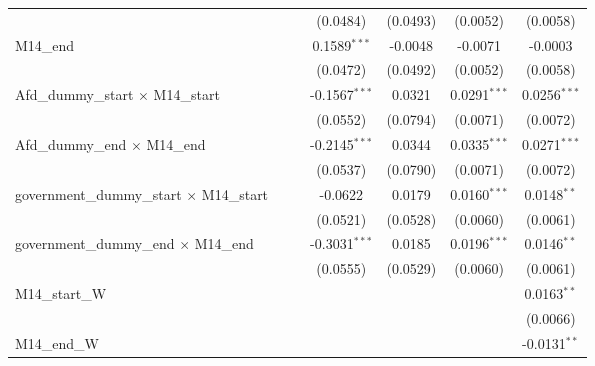 \documentclass[10pt,a4paper]{article}
\begin{document}
\begin{tabular}{lcccccc}
                                                    &                &                & (0.0484)        & (0.0493)       & (0.0052)        & (0.0058)\\    
   M14\_end                                         &                &                & 0.1589$^{***}$  & -0.0048        & -0.0071         & -0.0003\\   
                                                    &                &                & (0.0472)        & (0.0492)       & (0.0052)        & (0.0058)\\   
   Afd\_dummy\_start $\times$ M14\_start            &                &                & -0.1567$^{***}$ & 0.0321         & 0.0291$^{***}$  & 0.0256$^{***}$\\   
                                                    &                &                & (0.0552)        & (0.0794)       & (0.0071)        & (0.0072)\\   
   Afd\_dummy\_end $\times$ M14\_end                &                &                & -0.2145$^{***}$ & 0.0344         & 0.0335$^{***}$  & 0.0271$^{***}$\\   
                                                    &                &                & (0.0537)        & (0.0790)       & (0.0071)        & (0.0072)\\   
   government\_dummy\_start $\times$ M14\_start     &                &                & -0.0622         & 0.0179         & 0.0160$^{***}$  & 0.0148$^{**}$\\   
                                                    &                &                & (0.0521)        & (0.0528)       & (0.0060)        & (0.0061)\\   
   government\_dummy\_end $\times$ M14\_end         &                &                & -0.3031$^{***}$ & 0.0185         & 0.0196$^{***}$  & 0.0146$^{**}$\\   
                                                    &                &                & (0.0555)        & (0.0529)       & (0.0060)        & (0.0061)\\   
   M14\_start\_W                                    &                &                &                 &                &                 & 0.0163$^{**}$\\   
                                                    &                &                &                 &                &                 & (0.0066)\\   
   M14\_end\_W                                      &                &                &                 &                &                 & -0.0131$^{**}$\\   

\end{tabular}
\end{document}
